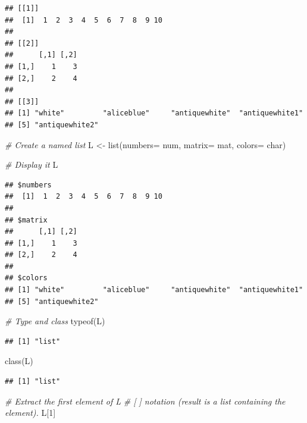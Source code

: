 \documentclass[
]{book}
\newenvironment{Shaded}{\begin{snugshade}}{\end{snugshade}}
\newcommand{\AttributeTok}[1]{\textcolor[rgb]{0.77,0.63,0.00}{#1}}
\newcommand{\CommentTok}[1]{\textcolor[rgb]{0.56,0.35,0.01}{\textit{#1}}}
\newcommand{\DecValTok}[1]{\textcolor[rgb]{0.00,0.00,0.81}{#1}}
\newcommand{\FunctionTok}[1]{\textcolor[rgb]{0.00,0.00,0.00}{#1}}
\newcommand{\NormalTok}[1]{#1}
\newcommand{\OtherTok}[1]{\textcolor[rgb]{0.56,0.35,0.01}{#1}}
\begin{document}
\begin{verbatim}
## [[1]]
##  [1]  1  2  3  4  5  6  7  8  9 10
## 
## [[2]]
##      [,1] [,2]
## [1,]    1    3
## [2,]    2    4
## 
## [[3]]
## [1] "white"         "aliceblue"     "antiquewhite"  "antiquewhite1"
## [5] "antiquewhite2"
\end{verbatim}

\begin{Shaded}
\begin{Highlighting}[]
\CommentTok{\# Create a named list}
\NormalTok{L }\OtherTok{\textless{}{-}} \FunctionTok{list}\NormalTok{(}\AttributeTok{numbers=}\NormalTok{ num, }\AttributeTok{matrix=}\NormalTok{ mat, }\AttributeTok{colors=}\NormalTok{ char)  }

\CommentTok{\# Display it}
\NormalTok{L}
\end{Highlighting}
\end{Shaded}

\begin{verbatim}
## $numbers
##  [1]  1  2  3  4  5  6  7  8  9 10
## 
## $matrix
##      [,1] [,2]
## [1,]    1    3
## [2,]    2    4
## 
## $colors
## [1] "white"         "aliceblue"     "antiquewhite"  "antiquewhite1"
## [5] "antiquewhite2"
\end{verbatim}

\begin{Shaded}
\begin{Highlighting}[]
\CommentTok{\# Type and class}
\FunctionTok{typeof}\NormalTok{(L)}
\end{Highlighting}
\end{Shaded}

\begin{verbatim}
## [1] "list"
\end{verbatim}

\begin{Shaded}
\begin{Highlighting}[]
\FunctionTok{class}\NormalTok{(L)}
\end{Highlighting}
\end{Shaded}

\begin{verbatim}
## [1] "list"
\end{verbatim}

\begin{Shaded}
\begin{Highlighting}[]
\CommentTok{\# Extract the first element of L}
\CommentTok{\# [ ] notation (result is a list containing the element).}
\NormalTok{L[}\DecValTok{1}\NormalTok{]}
\end{Highlighting}
\end{Shaded}
\end{document}
